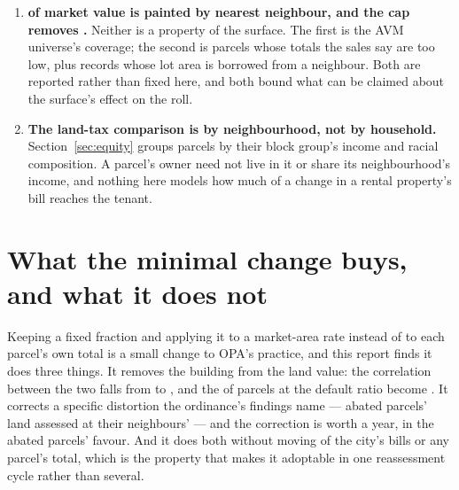 \documentclass[11pt]{article}
\begin{document}
\begin{enumerate}
  each, so a parcel's ten comparables routinely come from neighbouring areas, and where land sales
  are sparse --- the Far Northeast above all --- they come from far away. Lots that sold bare and
  were then built on are found from the building's construction year, so recent sales of that
  kind have not had time to show up and the stream is weighted toward older sales. Teardowns
  use a one-year window; widening it adds teardowns and barely moves their median, so the
  level finding does not depend on it. \LycdWitSubMinPct{} of the witnesses are sub-minimum lots;
  they are kept, and the paired-sales adjustment prices their lot size rather than treating them
  as a separate market.
\item \textbf{\LycdSfiveKnnValuePct{} of market value is painted by nearest neighbour, and
  the cap removes \LycdSfiveCapRemovedB{}.} Neither is a property of the surface. The first is
  the AVM universe's coverage; the second is \LycdSfivePreCapExceedsCore{} parcels whose totals
  the sales say are too low, plus \LycdSfivePreCapExceedsImputed{} records whose lot area is
  borrowed from a neighbour. Both are
  reported rather than fixed here, and both bound what can be claimed about the surface's
  effect on the roll.
\item \textbf{The land-tax comparison is by neighbourhood, not by household.}
  Section~\ref{sec:equity} groups parcels by their block group's income and racial composition.
  A parcel's owner need not live in it or share its neighbourhood's income, and nothing here
  models how much of a change in a rental property's bill reaches the tenant.
\end{enumerate}

\section{What the minimal change buys, and what it does not}

Keeping a fixed fraction and applying it to a market-area rate instead of to each parcel's
own total is a small change to OPA's practice, and this report finds it does three things. It
removes the building from the land value: the correlation between the two falls from
\LycdUniOPABuildingCorr{} to \LycdUniResplitBuildingCorr{}, and the \LycdDefaultRatioOpaPct{} of
parcels at the default ratio become \LycdDefaultRatioLycdPct{}. It corrects a specific
distortion the ordinance's findings name --- abated parcels' land assessed at
\LycdUniOPAAbatedRatio{} their neighbours' --- and the correction is worth \LycdCLevyAbsM{} a year,
in the abated parcels' favour. And it does both without moving \LycdCUnmovedPct{} of the
city's bills or any parcel's total, which is the property that makes it adoptable in one
reassessment cycle rather than several.
\end{document}
